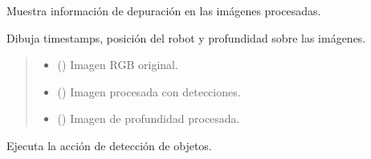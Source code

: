 \documentclass[a4paper,10pt,spanish]{sphinxmanual}
\begin{document}
\begin{fulllineitems}
\begin{fulllineitems}
\label{\detokenize{squad_object_detection_action:squad_object_detection_action.TurtleBotObjectDetectionAction.display_debug_info}}
\pysigstartsignatures
{}
\pysigstopsignatures
\sphinxAtStartPar
Muestra información de depuración en las imágenes procesadas.

\sphinxAtStartPar
Dibuja timestamps, posición del robot y profundidad sobre las imágenes.
\begin{quote}\begin{description}
\begin{itemize}
\item {} 
\sphinxAtStartPar
{} () \textendash{} Imagen RGB original.

\item {} 
\sphinxAtStartPar
{} () \textendash{} Imagen procesada con detecciones.

\item {} 
\sphinxAtStartPar
{} () \textendash{} Imagen de profundidad procesada.

\end{itemize}

\end{description}\end{quote}

\end{fulllineitems}


\begin{fulllineitems}
\label{\detokenize{squad_object_detection_action:squad_object_detection_action.TurtleBotObjectDetectionAction.execute}}
\pysigstartsignatures
{}
\pysigstopsignatures
\sphinxAtStartPar
Ejecuta la acción de detección de objetos.


\end{fulllineitems}
\end{fulllineitems}
\end{document}
